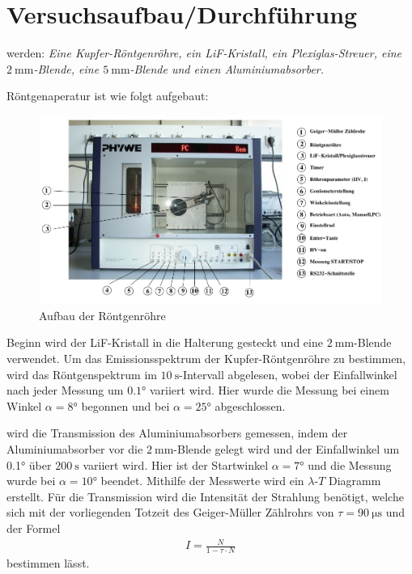 \newpage
\section{Versuchsaufbau/Durchführung}
    \justifying werden: \textit{Eine Kupfer-Röntgenröhre, ein LiF-Kristall, ein Plexiglas-Streuer, eine $\SI{2}{\milli\meter}$-Blende, eine $\SI{5}
    {\milli\meter}$-Blende und einen Aluminiumabsorber.}

    \justifying Röntgenaperatur ist wie folgt aufgebaut:
    \begin{figure}
        \centering
        \includegraphics[width=0.75\linewidth]{./images/Aufbau.jpg}
        \caption{Aufbau der Röntgenröhre \cite{V603}}
        \label{fig:1}
    \end{figure}

    \justifying Beginn wird der LiF-Kristall in die Halterung gesteckt und eine $\SI{2}{\milli\meter}$-Blende verwendet. Um das Emissionsspektrum der Kupfer-Röntgenröhre 
    zu bestimmen, wird das Röntgenspektrum im $\SI{10}{\second}$-Intervall abgelesen, wobei der Einfallwinkel nach jeder Messung um $0.1°$ variiert wird.
    Hier wurde die Messung bei einem Winkel $\alpha = 8°$ begonnen und bei $\alpha = 25°$ abgeschlossen. 

    \justifying wird die Transmission des Aluminiumabsorbers gemessen, indem der Aluminiumabsorber vor die $\SI{2}{\milli\meter}$-Blende gelegt wird und
    der Einfallwinkel um 0.1° über $\SI{200}{\second}$ variiert wird. Hier ist der Startwinkel $\alpha = 7°$ und die Messung wurde bei $\alpha = 10°$ beendet. 
    Mithilfe der Messwerte wird ein $\lambda$-$T$ Diagramm erstellt. Für die Transmission wird die Intensität der Strahlung benötigt, welche sich mit der vorliegenden
    Totzeit des Geiger-Müller Zählrohrs von $\tau = \SI{90}{\micro\second}$ und der Formel
    \begin{align}
        I = \frac{N}{1- \tau \cdot N} \label{eq:4}
    \end{align}
    bestimmen lässt. 

